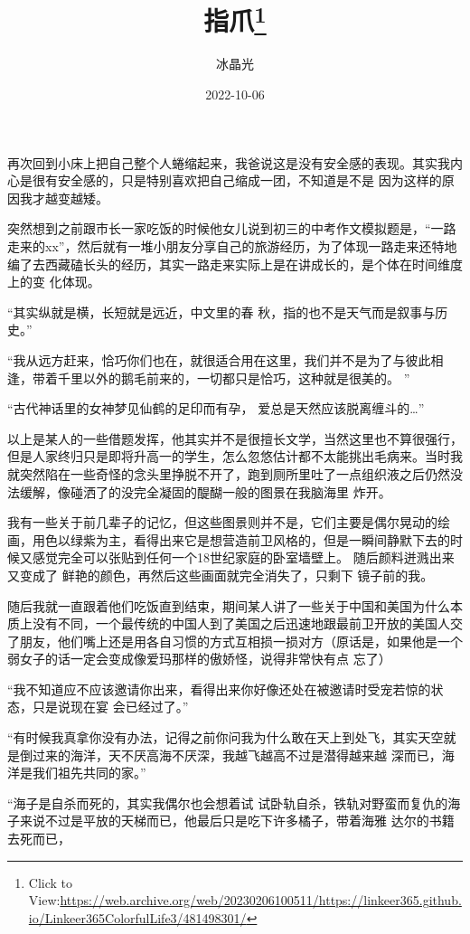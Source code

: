 \documentclass{article}
\title{指爪\footnote{Click to View:\url{https://web.archive.org/web/20230206100511/https://linkeer365.github.io/Linkeer365ColorfulLife3/481498301/}}}
\author{冰晶光}
\date{2022-10-06}
\begin{document}

\maketitle


\Large

﻿再次回到小床上把自己整个人蜷缩起来，我爸说这是没有安全感的表现。其实我内心是很有安全感的，只是特别喜欢把自己缩成一团，不知道是不是
因为这样的原因我才越变越矮。 

突然想到之前跟市长一家吃饭的时候他女儿说到初三的中考作文模拟题是，“一路走来的xx”，然后就有一堆小朋友分享自己的旅游经历，为了体现一路走来还特地编了去西藏磕长头的经历，其实一路走来实际上是在讲成长的，是个体在时间维度上的变
化体现。 

“其实纵就是横，长短就是远近，中文里的春
秋，指的也不是天气而是叙事与历史。”  

\newpage

“我从远方赶来，恰巧你们也在，就很适合用在这里，我们并不是为了与彼此相逢，带着千里以外的鹅毛前来的，一切都只是恰巧，这种就是很美的。
”  

“古代神话里的女神梦见仙鹤的足印而有孕，
爱总是天然应该脱离缠斗的…” 

以上是某人的一些借题发挥，他其实并不是很擅长文学，当然这里也不算很强行，但是人家终归只是即将升高一的学生，怎么忽悠估计都不太能挑出毛病来。当时我就突然陷在一些奇怪的念头里挣脱不开了，跑到厕所里吐了一点组织液之后仍然没法缓解，像碰洒了的没完全凝固的醍醐一般的图景在我脑海里
炸开。 

我有一些关于前几辈子的记忆，但这些图景则并不是，它们主要是偶尔晃动的绘画，用色以绿紫为主，看得出来它是想营造前卫风格的，但是一瞬间静默下去的时候又感觉完全可以张贴到任何一个18世纪家庭的卧室墙壁上。 随后颜料迸溅出来又变成了
\newpage
鲜艳的颜色，再然后这些画面就完全消失了，只剩下
镜子前的我。 

随后我就一直跟着他们吃饭直到结束，期间某人讲了一些关于中国和美国为什么本质上没有不同，一个最传统的中国人到了美国之后迅速地跟最前卫开放的美国人交了朋友，他们嘴上还是用各自习惯的方式互相损一损对方（原话是，如果他是一个弱女子的话一定会变成像爱玛那样的傲娇怪，说得非常快有点
忘了） 

“我不知道应不应该邀请你出来，看得出来你好像还处在被邀请时受宠若惊的状态，只是说现在宴
会已经过了。” 

“有时候我真拿你没有办法，记得之前你问我为什么敢在天上到处飞，其实天空就是倒过来的海洋，天不厌高海不厌深，我越飞越高不过是潜得越来越
深而已，海洋是我们祖先共同的家。” 

“海子是自杀而死的，其实我偶尔也会想着试
\newpage
试卧轨自杀，铁轨对野蛮而复仇的海子来说不过是平放的天梯而已，他最后只是吃下许多橘子，带着海雅
达尔的书籍去死而已， 
\end{document}
